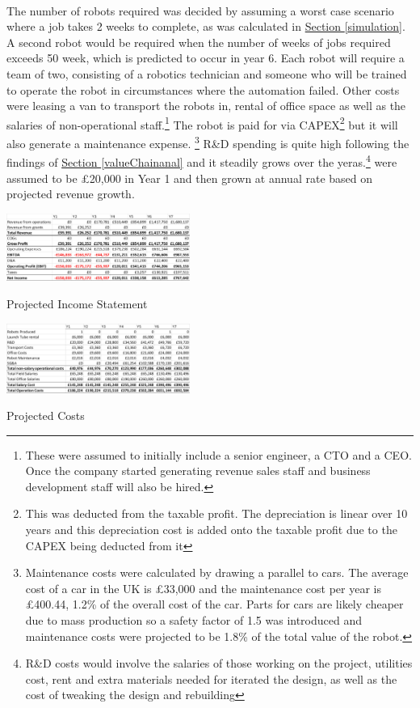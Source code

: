 \documentclass[11pt]{article}		%
\newcommand{\sectref}[1]{\hyperref[#1]{Section \ref*{#1}}}     %
\begin{document}
    \\ 
    \hspace*{3ex}The number of robots required was decided by assuming a worst case scenario where a job takes 2 weeks to complete, as was calculated in \sectref{simulation}. A second robot would be required when the number of weeks of jobs required exceeds 50 week, which is predicted to occur in year 6. Each robot will require a team of two, consisting of a robotics technician and someone who will be trained to operate the robot in circumstances where the automation failed. Other costs were leasing a van to transport the robots in, rental of office space as well as the salaries of non-operational staff.\footnote{These were assumed to initially include a senior engineer, a CTO and a CEO. Once the company started generating revenue sales staff and business development staff will also be hired.} The robot is paid for via CAPEX\footnote{This was deducted from the taxable profit. The depreciation is linear over 10 years and this depreciation cost is added onto the taxable profit due to the CAPEX being deducted from it} but it will also generate a maintenance expense. \footnote{Maintenance costs were calculated by drawing a parallel to cars. The average cost of a car in the UK is £33,000 and the maintenance cost per year is £400.44, 1.2\% of the overall cost of the car. Parts for cars are likely cheaper due to mass production so a safety factor of 1.5 was introduced and maintenance costs were projected to be 1.8\% of the total value of the robot.}  R\&D spending is quite high following the findings of \sectref{valueChainanal} and it steadily grows over the yeras.\footnote{R\&D costs would involve the salaries of those working on the project, utilities cost, rent and extra materials needed for iterated the design, as well as the cost of tweaking the design and rebuilding} were assumed to be £20,000 in Year 1 and then grown at annual rate based on projected revenue growth.
    \begin{table}[h]
					\centering
				\begin{multicols}{2}
				    
				\includegraphics[width=0.45\textwidth]{revenue projections 7 years v1.png}
					\caption{Projected Income Statement}
					\label{forecast_PL}
			
		            \columnbreak
		     
					\centering
					\includegraphics[width=0.45\textwidth]{cost projections 7 years v1.png}
					\caption{Projected Costs}
					\label{forecast_costs}
						\end{multicols}
				\end{table}
\end{document}
